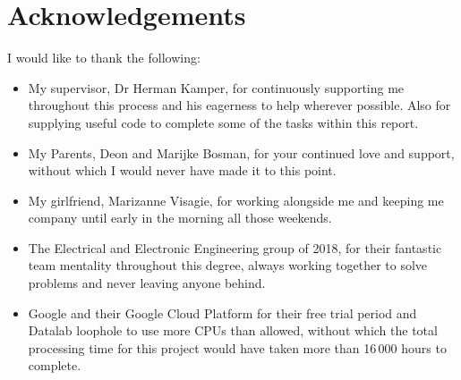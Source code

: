 \chapter*{Acknowledgements}
\makeatletter{}\makeatother

I would like to thank the following:

\begin{itemize}
\item My supervisor, Dr
Herman Kamper, for continuously supporting me throughout this process and his eagerness to help wherever possible.
Also for supplying useful code to complete some of the tasks within this report.
\item My Parents, Deon and Marijke Bosman, for your continued love and support, without which I would never have made it to this point.
\item My girlfriend, Marizanne Visagie, for working alongside me and keeping me company until early in the morning all those weekends.
\item The Electrical and Electronic Engineering group of 2018, for their fantastic team mentality throughout this degree, always working together to solve problems and never leaving anyone behind.
\item Google and their Google Cloud Platform for their free trial period and Datalab loophole to use more CPUs than allowed, without which the total processing time for this project would have taken more than 16\,000 hours to complete. 
\end{itemize}